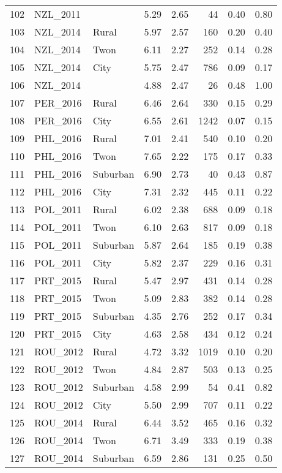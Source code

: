 \begin{table}[ht]
\begin{tabular}{rllrrrrr}
  102 & NZL\_2011 &  & 5.29 & 2.65 &  44 & 0.40 & 0.80 \\ 
  103 & NZL\_2014 & Rural & 5.97 & 2.57 & 160 & 0.20 & 0.40 \\ 
  104 & NZL\_2014 & Twon & 6.11 & 2.27 & 252 & 0.14 & 0.28 \\ 
  105 & NZL\_2014 & City & 5.75 & 2.47 & 786 & 0.09 & 0.17 \\ 
  106 & NZL\_2014 &  & 4.88 & 2.47 &  26 & 0.48 & 1.00 \\ 
  107 & PER\_2016 & Rural & 6.46 & 2.64 & 330 & 0.15 & 0.29 \\ 
  108 & PER\_2016 & City & 6.55 & 2.61 & 1242 & 0.07 & 0.15 \\ 
  109 & PHL\_2016 & Rural & 7.01 & 2.41 & 540 & 0.10 & 0.20 \\ 
  110 & PHL\_2016 & Twon & 7.65 & 2.22 & 175 & 0.17 & 0.33 \\ 
  111 & PHL\_2016 & Suburban & 6.90 & 2.73 &  40 & 0.43 & 0.87 \\ 
  112 & PHL\_2016 & City & 7.31 & 2.32 & 445 & 0.11 & 0.22 \\ 
  113 & POL\_2011 & Rural & 6.02 & 2.38 & 688 & 0.09 & 0.18 \\ 
  114 & POL\_2011 & Twon & 6.10 & 2.63 & 817 & 0.09 & 0.18 \\ 
  115 & POL\_2011 & Suburban & 5.87 & 2.64 & 185 & 0.19 & 0.38 \\ 
  116 & POL\_2011 & City & 5.82 & 2.37 & 229 & 0.16 & 0.31 \\ 
  117 & PRT\_2015 & Rural & 5.47 & 2.97 & 431 & 0.14 & 0.28 \\ 
  118 & PRT\_2015 & Twon & 5.09 & 2.83 & 382 & 0.14 & 0.28 \\ 
  119 & PRT\_2015 & Suburban & 4.35 & 2.76 & 252 & 0.17 & 0.34 \\ 
  120 & PRT\_2015 & City & 4.63 & 2.58 & 434 & 0.12 & 0.24 \\ 
  121 & ROU\_2012 & Rural & 4.72 & 3.32 & 1019 & 0.10 & 0.20 \\ 
  122 & ROU\_2012 & Twon & 4.84 & 2.87 & 503 & 0.13 & 0.25 \\ 
  123 & ROU\_2012 & Suburban & 4.58 & 2.99 &  54 & 0.41 & 0.82 \\ 
  124 & ROU\_2012 & City & 5.50 & 2.99 & 707 & 0.11 & 0.22 \\ 
  125 & ROU\_2014 & Rural & 6.44 & 3.52 & 465 & 0.16 & 0.32 \\ 
  126 & ROU\_2014 & Twon & 6.71 & 3.49 & 333 & 0.19 & 0.38 \\ 
  127 & ROU\_2014 & Suburban & 6.59 & 2.86 & 131 & 0.25 & 0.50 \\ 

\end{tabular}
\end{table}

